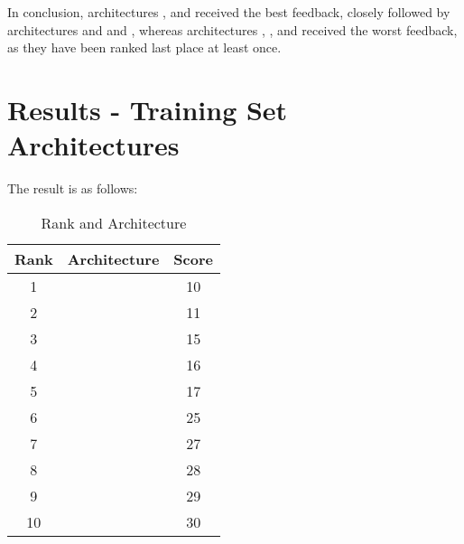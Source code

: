 In conclusion, architectures , and  received the best feedback, closely followed by architectures  and  and ,
whereas architectures , , and  received the worst feedback, as they have been ranked last place at least once.

\section{Results - Training Set Architectures}

The result is as follows:

\begin{table}[h]
    \label{table:survey}
    \centering
    \caption{Rank and Architecture}
    \begin{tabular}{ |c|c|c| } 
    \hline
    Rank & Architecture & Score \\
    \hline
    1 & \nameref{fig:architecture3} & 10 \\
    2 & \nameref{fig:architecture8} & 11 \\
    3 & \nameref{fig:architecture6} & 15 \\
    4 & \nameref{fig:architecture10} & 16 \\
    5 & \nameref{fig:architecture2} & 17 \\
    6 & \nameref{fig:architecture1} & 25 \\
    7 & \nameref{fig:architecture5} & 27 \\
    8 & \nameref{fig:architecture7} & 28 \\
    9 & \nameref{fig:architecture9} & 29 \\
    10 & \nameref{fig:architecture4} & 30\\
    \hline
    \end{tabular}
\end{table}
